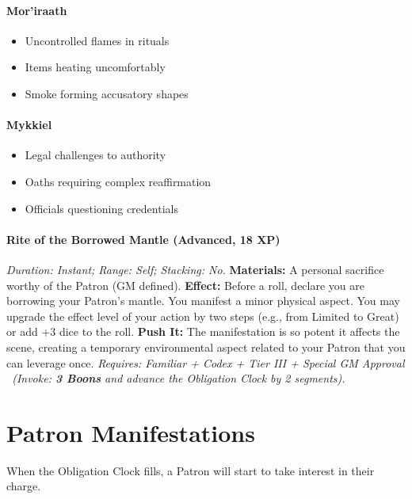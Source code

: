 \documentclass[12pt,twoside]{book}
\begin{document}
\paragraph{Mor'iraath}
\begin{itemize}
\item Uncontrolled flames in rituals
\item Items heating uncomfortably
\item Smoke forming accusatory shapes
\end{itemize}

\paragraph{Mykkiel}
\begin{itemize}
\item Legal challenges to authority
\item Oaths requiring complex reaffirmation
\item Officials questioning credentials
\end{itemize}
\paragraph{Rite of the Borrowed Mantle (Advanced, 18 XP)} \emph{Duration: Instant; Range: Self; Stacking: No.}
\textbf{Materials:} A personal sacrifice worthy of the Patron (GM defined).
\textbf{Effect:} Before a roll, declare you are borrowing your Patron's mantle. You manifest a minor physical aspect. You may upgrade the effect level of your action by two steps (e.g., from Limited to Great) or add +3 dice to the roll.
\textbf{Push It:} The manifestation is so potent it affects the scene, creating a temporary environmental aspect related to your Patron that you can leverage once.
\emph{Requires: Familiar + Codex + Tier III + Special GM Approval \ (\textit{Invoke:} \textbf{3 Boons} and advance the Obligation Clock by 2 segments).}


\section{Patron Manifestations}

When the Obligation Clock fills, a Patron will start to take interest in their charge. 
\end{document}
